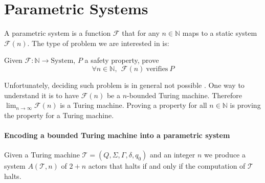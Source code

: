 \documentclass[a4paper]{report}
\numberwithin{algorithm}{chapter}
\begin{document}
\section{Parametric Systems}
A parametric system is a function $\mathcal{F}$ that for any $n \in \mathbb{N}$ maps to a static system $\mathcal{F}(n)$.
The type of problem we are interested in is:

Given $\mathcal{F}: \mathbb{N} \rightarrow \text{System}$, $P$ a safety property, prove
\begin{equation}
\forall n \in \mathbb{N}, ~~ \mathcal{F}(n) ~\text{verifies} ~ P
\end{equation}

Unfortunately, deciding such problem is in general not possible \cite{DBLP:journals/ipl/AptK86}.
One way to understand it is to have $\mathcal{F}(n)$ be a $n$-bounded Turing machine.
Therefore $\lim_{n \rightarrow \infty} \mathcal{F}(n)$ is a Turing machine.
Proving a property for all $n \in \mathbb{N}$ is proving the property for a Turing machine.

\paragraph{Encoding a bounded Turing machine into a parametric system}
\label{btm}
Given a Turing machine $\mathcal{T} = (Q,\Sigma,\Gamma,\delta,q_0)$ \cite{Turing37, Sipser97} and an integer $n$ we produce 
a system $A(\mathcal{T},n)$ of $2 + n$ actors that halts if and only if the computation of $\mathcal{T}$ halts.
\end{document}
